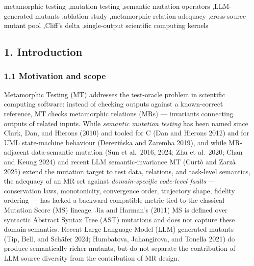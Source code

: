 \documentclass[review,12pt,authoryear]{elsarticle}
\begin{document}
\begin{frontmatter}
\begin{abstract}
\textbf{Conclusion.} Restricting the source-axis comparison to the only contrast not inheriting the \S3.4 post-hoc selection (v3 with $\delta = 0.323$ versus v4-mp5 with $\delta = 0.314$, $\Delta\delta = -0.009$), the LLM-identity axis (Claude / GPT / DeepSeek under an identical prompt) does not appreciably shift $\delta$ within this design. We do not infer that source diversity is broadly inert; the strong-sense test (per-LLM differential prompts; sample $n_{\text{PUT}} \geq 30$) is deferred to P4. The \S3.5 evidence (5.14\% AST overlap, 0/0/0 unreachability for HP / SI / TF under default first-order syntactic configurations; HOM not refuted) is independent of the H2 effect-size question. SMS is a backward-compatible adequacy metric for domain-semantic MR sets.
\end{abstract}

\begin{keyword}
metamorphic testing \sep mutation testing \sep semantic mutation operators \sep LLM-generated mutants \sep ablation study \sep metamorphic relation adequacy \sep cross-source mutant pool \sep Cliff's delta \sep single-output scientific computing kernels
\end{keyword}

\end{frontmatter}

\subsection{1. Introduction}\label{introduction}

\subsubsection{1.1 Motivation and scope}\label{motivation-and-scope}

Metamorphic Testing (MT) addresses the test-oracle problem in scientific
computing software: instead of checking outputs against a known-correct
reference, MT checks metamorphic relations (MRs) --- invariants
connecting outputs of related inputs. While \emph{semantic mutation
testing} has been named since Clark, Dan, and Hierons (2010) and tooled
for C (Dan and Hierons 2012) and for UML state-machine behaviour
(Derezińska and Zaremba 2019), and while MR-adjacent data-semantic
mutation (Sun et al.~2016, 2024; Zhu et al.~2020; Chan and Keung 2024)
and recent LLM semantic-invariance MT (Curtò and Zarzà 2025) extend the
mutation target to test data, relations, and task-level semantics, the
adequacy of an MR set against \emph{domain-specific code-level faults}
--- conservation laws, monotonicity, convergence order, trajectory
shape, fidelity ordering --- has lacked a backward-compatible metric
tied to the classical Mutation Score (MS) lineage. Jia and Harman's
(2011) MS is defined over syntactic Abstract Syntax Tree (AST) mutations
and does not capture these domain semantics. Recent Large Language Model
(LLM) generated mutants (Tip, Bell, and Schäfer 2024; Humbatova,
Jahangirova, and Tonella 2021) do produce semantically richer mutants,
but do not separate the contribution of LLM source diversity from the
contribution of MR design.
\end{document}
